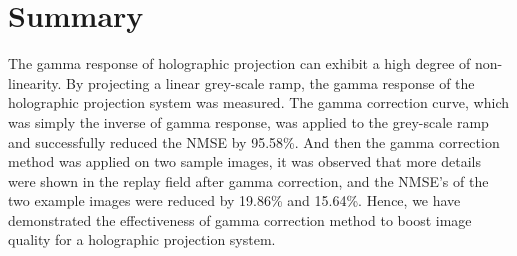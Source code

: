 \section{Summary}
The gamma response of holographic projection can exhibit a high degree of non-linearity. By projecting a linear grey-scale ramp, the gamma response of the holographic projection system was measured. The gamma correction curve, which was simply the inverse of gamma response, was applied to the grey-scale ramp and successfully reduced the NMSE by 95.58\%. And then the gamma correction method was applied on two sample images, it was observed that more details were shown in the replay field after gamma correction, and the NMSE's of the two example images were reduced by 19.86\% and 15.64\%. Hence, we have demonstrated the effectiveness of gamma correction method to boost image quality for a holographic projection system.
